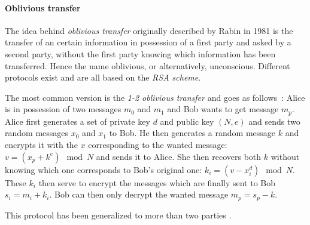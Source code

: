 \paragraph{Oblivious transfer}
The idea behind \emph{oblivious transfer} originally described by Rabin in 1981 \cite{Rabin1981HowTransfer.} is the transfer of an certain information in possession of a first party and asked by a second party, without the first party knowing which information has been transferred. Hence the name oblivious, or alternatively, unconscious. Different protocols exist and are all based on the \emph{RSA scheme}. 

The most common version is the \emph{1-2 oblivious transfer} and goes as follows~\cite{Even1985AContracts}: Alice is in possession of two messages $m_0$ and $m_1$ and Bob wants to get message $m_p$. Alice first generates a set of private key $d$ and public key $(N,e)$ and sends two random messages $x_0$ and $x_1$ to Bob. He then generates a random message $k$ and encrypts it with the $x$ corresponding to the wanted message: $v = \left(x_p + k^e\right) \mod N$ and sends it to Alice. She then recovers both $k$ without knowing which one corresponds to Bob's original one: $k_i = \left(v-x_i^d\right) \mod N$. These $k_i$ then serve to encrypt the messages which are finally sent to Bob $s_i = m_i+k_i$. Bob can then only decrypt the wanted message $m_p = s_p-k$. 

This protocol has been generalized to more than two parties \cite{Ishai1997PrivateApplications,Shankar2008AlternativeTransfer,Tassa2011GeneralizedSharing}.

